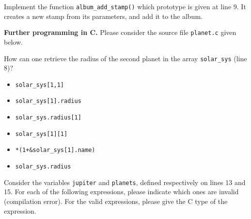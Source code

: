 \documentclass[10pt]{article}\usepackage[enonce]{exemptty}
\newenvironment{Live}%
    {\color{RoyalPurple}}%
    {\color{black}}
\begin{document}
\begin{Live}
  
\Question Implement the function \texttt{album\_add\_stamp()} which prototype is
given at line 9. It creates a new stamp from its parameters, and add it to the
album.


\Exercise\textbf{Further programming in C.}
Please consider the source file  \texttt{planet.c} given below.

\smallskip%
\Question How can one retrieve the radius of the second planet in the array
\texttt{solar\_sys} (line 8)?

\noindent
\begin{minipage}{.33\linewidth}
  \begin{itemize}
  \item[\fbox{a}] \verb+solar_sys[1,1]+
  \item[\fbox{b}] \verb+solar_sys[1].radius+
  \end{itemize}  
\end{minipage}
\begin{minipage}{.33\linewidth}
  \begin{itemize}
  \item[\fbox{c}] \verb+solar_sys.radius[1]+
  \item[\fbox{d}] \verb|solar_sys[1][1]|
  \end{itemize}  
\end{minipage}
\begin{minipage}{.33\linewidth}
  \begin{itemize}  
  \item[\fbox{e}] \verb|*(1+&solar_sys[1].name)|
  \item[\fbox{f}] \verb+solar_sys.radius+
  \end{itemize}  
\end{minipage}

\smallskip%
\Question Consider the variables \texttt{jupiter} and \texttt{planets}, defined
respectively on lines 13 and 15. For each of the following expressions, please
indicate which ones are invalid (compilation error). For the valid expressions,
please give the C type of the expression.


\end{Live}
\end{document}
